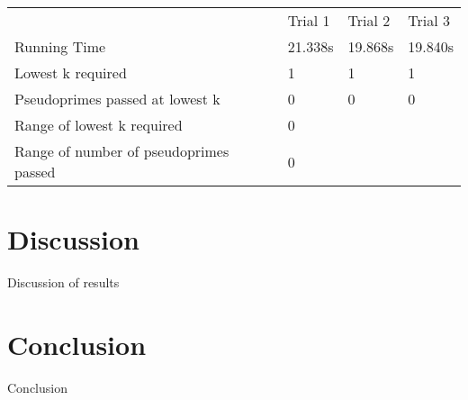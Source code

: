 \documentclass{article}
\begin{document}
\begin{table}[h]
\begin{tabular}{@{}llll@{}}
                                       & Trial 1     & Trial 2    & Trial 3    \\
Running Time                           & 21.338s     & 19.868s    & 19.840s    \\
Lowest k required                      & 1           & 1          & 1          \\
Pseudoprimes passed at lowest k        & 0           & 0          & 0          \\
Range of lowest k required             & \multicolumn{3}{l}{0}                 \\
Range of number of pseudoprimes passed & \multicolumn{3}{l}{0}                 \\ \bottomrule
\end{tabular}
\end{table}
\label{table:euler}
\FloatBarrier

\section{Discussion}
Discussion of results

\section{Conclusion}
Conclusion

\nocite{*}


\end{document}
